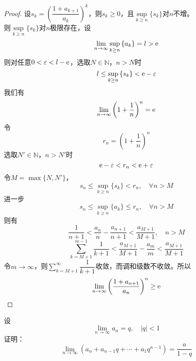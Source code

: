\begin{proof}

    设$s_k = \left( \dfrac{1+a_{k+1}}{a_k} \right)^k$，则$s_k \geq 0$，且$\sup\limits_{k\geq n}\{s_k\}$对$n$不增。\\
    则$\sup\limits_{k\geq n}\{s_k\}$对$n$极限存在，设
    $$\lim\limits_{n\to\infty}{\sup_{k\geq n}{\{a_k\}}} = l >\mathrm{e}$$
    则对任意$0 < \varepsilon < l - \mathrm{e}$，选取$N \in \mathbb{N}$，$n > N$时
    $$l \leq \sup_{k\geq n }{\{s_k\}} < \mathrm{e} - \varepsilon$$
    我们有
    $$\lim\limits_{n\to\infty}{\left( 1 + \dfrac{1}{n}\right)^n} = \mathrm{e}$$
    令
    $$r_n = \left(1 + \dfrac{1}{n}\right)^n$$
    选取$N' \in \mathbb{N}$，$n > N'$时
    $$\mathrm{e} - \varepsilon < r_n < \mathrm{e} + \varepsilon$$
    令$M = \max\{N,N'\}$，
    $$s_n \leq \sup_{k\geq n}\{s_k\} < r_n, \quad \forall n > M$$
    进一步
    $$s_n \leq \sup_{k\geq n}\{a_k\} \leq r_n,\quad \forall n > M$$
    则有
    $$\dfrac{1}{n + 1} < \dfrac{a_n}{n} - \dfrac{a_{n+1}}{n+1} < \dfrac{a_{M + 1}}{M + 1}, \quad n > M$$
    $$\sum\limits_{k = M + 1}^{m-1}{\dfrac{1}{k+1}} < \dfrac{a_{M + 1}}{M + 1} - \dfrac{a_m}{m} < \dfrac{a_{M + 1}}{M + 1}$$
    令$m \to \infty$，则$\sum\limits_{k = M + 1}^{\infty}{\dfrac{1}{k + 1}}$收敛，而调和级数不收敛。所以
    $$\lim\limits_{n\to\infty}{\left( \dfrac{1 + a_{n + 1}}{a_n} \right)^n} \geq \mathrm{e}$$

\end{proof}

\begin{proposition}
    
    设
    $$\lim\limits_{n\to\infty}{a_n} = q, \quad |q| < 1$$
    证明：
    $$\lim\limits_{n\to\infty}{(a_n + a_{n-1}q + \cdots + a_1q^{n-1})} = \dfrac{a}{1 - q}$$

\end{proposition}

